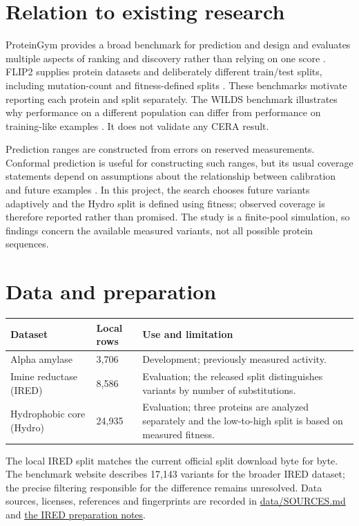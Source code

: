 \documentclass[11pt,a4paper]{article}
\begin{document}
\section{Relation to existing research}
ProteinGym provides a broad benchmark for prediction and design and evaluates multiple aspects of ranking and discovery rather than relying on one score \cite{proteingym}. FLIP2 supplies protein datasets and deliberately different train/test splits, including mutation-count and fitness-defined splits \cite{flip2}. These benchmarks motivate reporting each protein and split separately. The WILDS benchmark illustrates why performance on a different population can differ from performance on training-like examples \cite{wilds}. It does not validate any CERA result.

Prediction ranges are constructed from errors on reserved measurements. Conformal prediction is useful for constructing such ranges, but its usual coverage statements depend on assumptions about the relationship between calibration and future examples \cite{conformal}. In this project, the search chooses future variants adaptively and the Hydro split is defined using fitness; observed coverage is therefore reported rather than promised. The study is a finite-pool simulation, so findings concern the available measured variants, not all possible protein sequences.

\section{Data and preparation}
\begin{center}
\begin{tabular}{@{}p{3.1cm}p{1.8cm}p{7.4cm}@{}}
\toprule
Dataset & Local rows & Use and limitation \\
\midrule
Alpha amylase & 3,706 & Development; previously measured activity. \\
Imine reductase (IRED) & 8,586 & Evaluation; the released split distinguishes variants by number of substitutions. \\
Hydrophobic core (Hydro) & 24,935 & Evaluation; three proteins are analyzed separately and the low-to-high split is based on measured fitness. \\
\bottomrule
\end{tabular}
\end{center}
The local IRED split matches the current official split download byte for byte. The benchmark website describes 17,143 variants for the broader IRED dataset; the precise filtering responsible for the difference remains unresolved. Data sources, licenses, references and fingerprints are recorded in \href{../../data/SOURCES.md}{data/SOURCES.md} and \href{../../research/ired_preparation.md}{the IRED preparation notes}.
\end{document}

